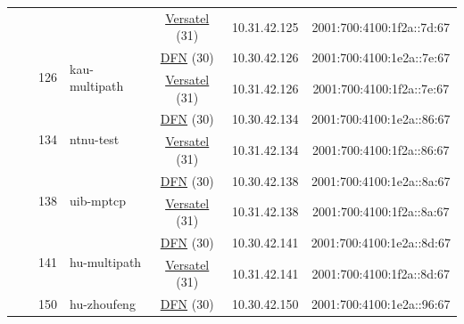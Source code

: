 \begin{small}
\begin{center}
\begin{longtable}{|c|c|c|c|c|c|c|c|}
  &  &  &  & \multicolumn{2}{|c|}{\tiny{\href{http://www.versatel.de}{Versatel} (31)}} & \tiny{10.31.42.125} & \tiny{2001:700:4100:1f2a::7d:67} \\* \cline{3-3}\cline{4-4}\cline{5-5}\cline{6-6}\cline{7-7}\cline{8-8}
  &  & \multirow{2}{*}{\tiny{126}} & \multicolumn{1}{|l|}{\multirow{2}{*}{\tiny{kau-multipath}}} & \multicolumn{2}{|c|}{\tiny{\href{https://www.dfn.de}{DFN} (30)}} & \tiny{10.30.42.126} & \tiny{2001:700:4100:1e2a::7e:67} \\* \cline{5-5}\cline{6-6}\cline{7-7}\cline{8-8}
  &  &  &  & \multicolumn{2}{|c|}{\tiny{\href{http://www.versatel.de}{Versatel} (31)}} & \tiny{10.31.42.126} & \tiny{2001:700:4100:1f2a::7e:67} \\* \cline{3-3}\cline{4-4}\cline{5-5}\cline{6-6}\cline{7-7}\cline{8-8}
  &  & \multirow{2}{*}{\tiny{134}} & \multicolumn{1}{|l|}{\multirow{2}{*}{\tiny{ntnu-test}}} & \multicolumn{2}{|c|}{\tiny{\href{https://www.dfn.de}{DFN} (30)}} & \tiny{10.30.42.134} & \tiny{2001:700:4100:1e2a::86:67} \\* \cline{5-5}\cline{6-6}\cline{7-7}\cline{8-8}
  &  &  &  & \multicolumn{2}{|c|}{\tiny{\href{http://www.versatel.de}{Versatel} (31)}} & \tiny{10.31.42.134} & \tiny{2001:700:4100:1f2a::86:67} \\* \cline{3-3}\cline{4-4}\cline{5-5}\cline{6-6}\cline{7-7}\cline{8-8}
  &  & \multirow{2}{*}{\tiny{138}} & \multicolumn{1}{|l|}{\multirow{2}{*}{\tiny{uib-mptcp}}} & \multicolumn{2}{|c|}{\tiny{\href{https://www.dfn.de}{DFN} (30)}} & \tiny{10.30.42.138} & \tiny{2001:700:4100:1e2a::8a:67} \\* \cline{5-5}\cline{6-6}\cline{7-7}\cline{8-8}
  &  &  &  & \multicolumn{2}{|c|}{\tiny{\href{http://www.versatel.de}{Versatel} (31)}} & \tiny{10.31.42.138} & \tiny{2001:700:4100:1f2a::8a:67} \\* \cline{3-3}\cline{4-4}\cline{5-5}\cline{6-6}\cline{7-7}\cline{8-8}
  &  & \multirow{2}{*}{\tiny{141}} & \multicolumn{1}{|l|}{\multirow{2}{*}{\tiny{hu-multipath}}} & \multicolumn{2}{|c|}{\tiny{\href{https://www.dfn.de}{DFN} (30)}} & \tiny{10.30.42.141} & \tiny{2001:700:4100:1e2a::8d:67} \\* \cline{5-5}\cline{6-6}\cline{7-7}\cline{8-8}
  &  &  &  & \multicolumn{2}{|c|}{\tiny{\href{http://www.versatel.de}{Versatel} (31)}} & \tiny{10.31.42.141} & \tiny{2001:700:4100:1f2a::8d:67} \\* \cline{3-3}\cline{4-4}\cline{5-5}\cline{6-6}\cline{7-7}\cline{8-8}
  &  & \multirow{2}{*}{\tiny{150}} & \multicolumn{1}{|l|}{\multirow{2}{*}{\tiny{hu-zhoufeng}}} & \multicolumn{2}{|c|}{\tiny{\href{https://www.dfn.de}{DFN} (30)}} & \tiny{10.30.42.150} & \tiny{2001:700:4100:1e2a::96:67} \\* \cline{5-5}\cline{6-6}\cline{7-7}\cline{8-8}

\end{longtable}
\end{center}
\end{small}
